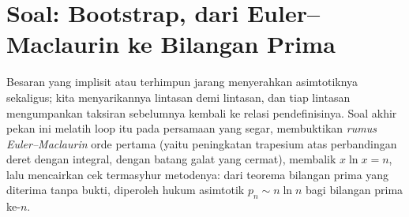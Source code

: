 \section{Soal: Bootstrap, dari Euler--Maclaurin ke Bilangan
Prima}

Besaran yang implisit atau terhimpun jarang menyerahkan
asimtotiknya sekaligus; kita menyarikannya lintasan demi lintasan, dan
tiap lintasan mengumpankan taksiran sebelumnya kembali ke relasi
pendefinisinya. Soal akhir pekan ini melatih loop itu pada persamaan yang
segar, membuktikan \emph{rumus Euler--Maclaurin} orde pertama (yaitu
peningkatan trapesium atas perbandingan deret dengan integral, 
dengan batang galat yang cermat), membalik $x\ln x = n$, lalu mencairkan
cek termasyhur metodenya: dari teorema bilangan prima yang diterima tanpa
bukti, diperoleh hukum asimtotik $p_n \sim n\ln n$ bagi bilangan prima ke-$n$.

